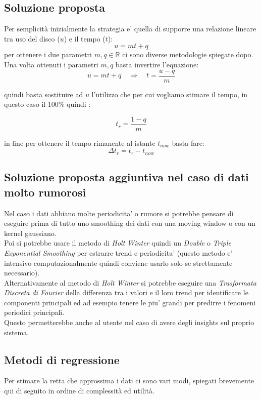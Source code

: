 \documentclass{article}
\begin{document}
\subsection{Soluzione proposta}
Per semplicità inizialmente la strategia e' quella di supporre una relazione lineare tra uso del disco (\(u\)) e il tempo (\(t\)):
\[u = m t + q\]
per ottenere i due parametri \(m, q \in \mathbb{R}\) ci sono diverse metodologie spiegate dopo.
\\
Una volta ottenuti i parametri \(m, q\) basta invertire l'equazione:
\[u = m t + q \quad \Rightarrow \quad t = \frac{u - q}{m}\]

quindi basta sostituire ad \(u\) l'utilizzo che per cui vogliamo stimare il tempo, in questo caso il 100\% quindi :

\[t_r = \frac{1 - q}{m}\]

in fine per ottenere il tempo rimanente al istante \(t_{now}\)  basta fare:
\[\Delta t_r = t_r - t_{now}\]

\subsection{Soluzione proposta aggiuntiva nel caso di dati molto rumorosi}
Nel caso i dati abbiano molte periodicita' o rumore si potrebbe pensare di eseguire prima di tutto uno smoothing dei dati con una moving window o con un kernel gaussiano.
\\
Poi si potrebbe usare il metodo di \textit{Holt Winter} quindi un \textit{Double} o \textit{Triple Exponential Smoothing} per estrarre trend e periodicita' (questo metodo e' intensivo computazionalmente quindi conviene usarlo solo se strettamente necessario).
\\
Alternativamente al metodo di \textit{Holt Winter}  si potrebbe eseguire una \textit{Trasformata Discreta di Fourier} della differenza tra i valori e il loro trend per identificare le componenti principali ed ad esempio tenere le piu' grandi per predirre i fenomeni  periodici principali.
\\
Questo permetterebbe anche al utente nel caso di avere degli insights sul proprio sistema.

\subsection{Metodi di regressione}
Per stimare la retta che approssima i dati ci sono vari modi, spiegati brevemente qui di seguito in ordine di complessità ed utilità.
\end{document}
